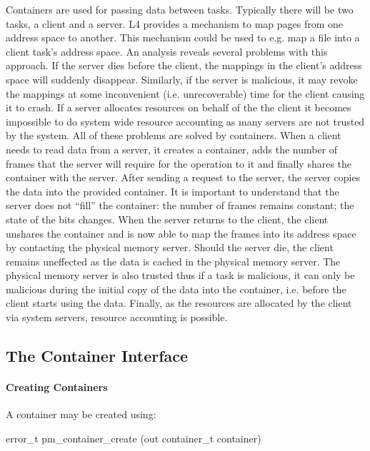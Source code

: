 Containers are used for passing data between tasks.  Typically there
will be two tasks, a client and a server.  L4 provides a mechanism to
map pages from one address space to another.  This mechanism could be
used to e.g. map a file into a client task's address space.  An
analysis reveals several problems with this approach.  If the server
dies before the client, the mappings in the client's address space
will suddenly disappear.  Similarly, if the server is malicious, it
may revoke the mappings at some inconvenient (i.e. unrecoverable) time
for the client causing it to crash.  If a server allocates resources
on behalf of the the client it becomes impossible to do system wide
resource accounting as many servers are not trusted by the system.
All of these problems are solved by containers.  When a client needs
to read data from a server, it creates a container, adds the number of
frames that the server will require for the operation to it and
finally shares the container with the server.  After sending a request
to the server, the server copies the data into the provided container.
It is important to understand that the server does not ``fill'' the
container: the number of frames remains constant; the state of the
bits changes.  When the server returns to the client, the client
unshares the container and is now able to map the frames into its
address space by contacting the physical memory server.  Should the
server die, the client remains uneffected as the data is cached in the
physical memory server.  The physical memory server is also trusted
thus if a task is malicious, it can only be malicious during the
initial copy of the data into the container, i.e. before the client
starts using the data.  Finally, as the resources are allocated by the
client via system servers, resource accounting is possible.

\subsection{The Container Interface}

\paragraph{Creating Containers}

A container may be created using:

\begin{code}
error\_t pm\_container\_create (out container\_t container)
\end{code}

